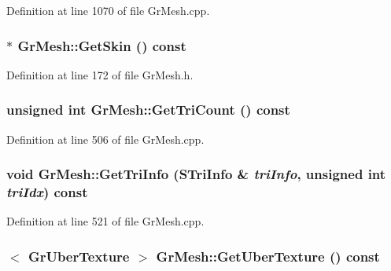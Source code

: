 Definition at line 1070 of file GrMesh.cpp.\hypertarget{class_gr_mesh_c0e189866d26fbb6f47f53e84168f936}{
\subsubsection[{GetSkin}]{$\ast$ GrMesh::GetSkin () const}}
\label{class_gr_mesh_c0e189866d26fbb6f47f53e84168f936}




Definition at line 172 of file GrMesh.h.\hypertarget{class_gr_mesh_e7333b5704ae13ba18cc501569f5777f}{
\subsubsection[{GetTriCount}]{\setlength{\rightskip}{0pt plus 5cm}unsigned int GrMesh::GetTriCount () const}}
\label{class_gr_mesh_e7333b5704ae13ba18cc501569f5777f}




Definition at line 506 of file GrMesh.cpp.\hypertarget{class_gr_mesh_849176ce5be062beb72f947828846b2a}{
\subsubsection[{GetTriInfo}]{\setlength{\rightskip}{0pt plus 5cm}void GrMesh::GetTriInfo ({\bf STriInfo} \& {\em triInfo}, \/  unsigned int {\em triIdx}) const}}
\label{class_gr_mesh_849176ce5be062beb72f947828846b2a}




Definition at line 521 of file GrMesh.cpp.\hypertarget{class_gr_mesh_37000fa9e2a6d480b6956f862e8372d6}{
\subsubsection[{GetUberTexture}]{$<$ {\bf GrUberTexture} $>$ GrMesh::GetUberTexture () const}}
\label{class_gr_mesh_37000fa9e2a6d480b6956f862e8372d6}




